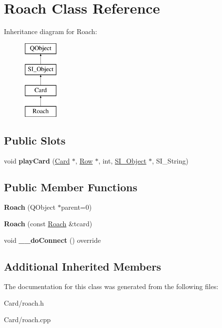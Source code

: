 \hypertarget{class_roach}{}\section{Roach Class Reference}
\label{class_roach}
Inheritance diagram for Roach\+:\begin{figure}[H]
\begin{center}
\leavevmode
\includegraphics[height=4.000000cm]{class_roach}
\end{center}
\end{figure}
\subsection*{Public Slots}
\begin{DoxyCompactItemize}
\item 
\mbox{\label{class_roach_a63eb50a5e366cc7e62d41a55a03f0f16}} 
void {\bfseries play\+Card} (\hyperlink{class_card}{Card} $\ast$, \hyperlink{class_card_set}{Row} $\ast$, int, \hyperlink{class_s_i___object}{S\+I\+\_\+\+Object} $\ast$, S\+I\+\_\+\+String)
\end{DoxyCompactItemize}
\subsection*{Public Member Functions}
\begin{DoxyCompactItemize}
\item 
\mbox{\label{class_roach_ae4ceae8b817e7b36f26b2ed1dc960e82}} 
{\bfseries Roach} (Q\+Object $\ast$parent=0)
\item 
\mbox{\label{class_roach_a825b2429483497f9b264ff282ebbadba}} 
{\bfseries Roach} (const \hyperlink{class_roach}{Roach} \&tcard)
\item 
\mbox{\label{class_roach_aa67d1e0a17f7b85b8a5ccc82f2e39e71}} 
void {\bfseries \+\_\+\+\_\+do\+Connect} () override
\end{DoxyCompactItemize}
\subsection*{Additional Inherited Members}


The documentation for this class was generated from the following files\+:\begin{DoxyCompactItemize}
\item 
Card/roach.\+h\item 
Card/roach.\+cpp\end{DoxyCompactItemize}
